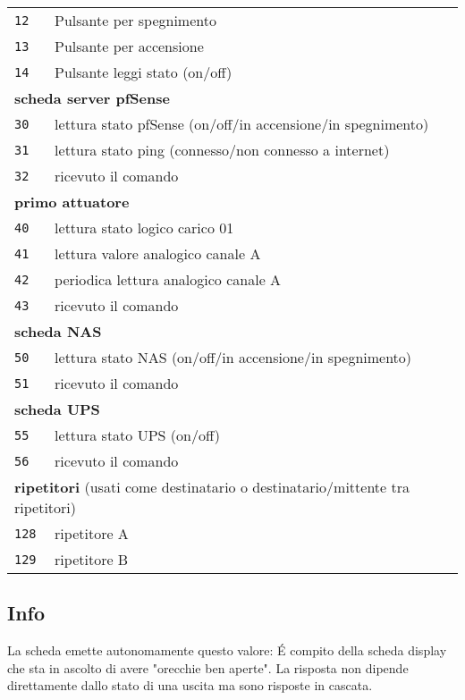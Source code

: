 \documentclass[italian]{article}
\begin{document}
\begin{tabular}{ll}
			\texttt{12} & Pulsante per spegnimento\\
			\texttt{13} & Pulsante per accensione\\
			\texttt{14} & Pulsante leggi stato (on/off)\\			
            \multicolumn{2}{l}{\textbf{scheda server pfSense}}\\
            \texttt{30} & lettura stato pfSense (on/off/in accensione/in spegnimento)\\        
            \texttt{31} & lettura stato ping (connesso/non connesso a internet)\\            
            \texttt{32} & ricevuto il comando\\
            \multicolumn{2}{l}{\textbf{primo attuatore}}\\
		    \texttt{40} & lettura stato logico carico 01\\ 
		    \texttt{41} & lettura valore analogico canale A\\
		    \texttt{42} & periodica lettura analogico canale A\\
			\texttt{43} & ricevuto il comando\\
			\multicolumn{2}{l}{\textbf{scheda NAS}}\\
			\texttt{50} & lettura stato NAS (on/off/in accensione/in spegnimento)\\
			\texttt{51} & ricevuto il comando\\
			\multicolumn{2}{l}{\textbf{scheda UPS}}\\
			\texttt{55} & lettura stato UPS (on/off)\\
			\texttt{56} & ricevuto il comando\\
			\multicolumn{2}{l}{\textbf{ripetitori} (usati come destinatario o destinatario/mittente tra ripetitori)}\\
			\texttt{128} & ripetitore A\\    
			\texttt{129} & ripetitore B\\ 
        \end{tabular}

    \subsection*{Info}
    
    La scheda emette autonomamente questo valore: \'E compito della scheda display che sta in ascolto di avere "orecchie ben aperte". La risposta non dipende direttamente dallo stato di una uscita ma sono risposte in cascata.
    
\end{document}
